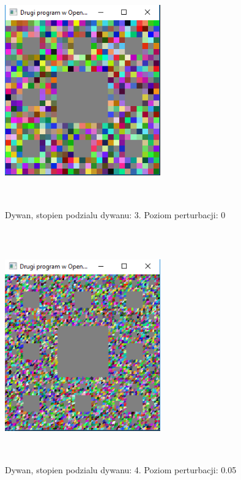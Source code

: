 \documentclass[polish,polish,a4paper]{article}
\begin{document}
                \begin{figure}[h!]
      \centering
      \includegraphics[width=0.6\textwidth,height=10cm]{dywan1.png}
      \caption{Dywan, stopien podzialu dywanu: 3. Poziom perturbacji: 0}
      \label{fig:zrzut1}
    \end{figure}
    
      \begin{figure}[h!]
      \centering
      \includegraphics[width=0.6\textwidth,height=10cm]{dywan2.png}
      \caption{Dywan, stopien podzialu dywanu: 4. Poziom perturbacji: 0.05}
      \label{fig:zrzut1}
    \end{figure}
\end{document}
